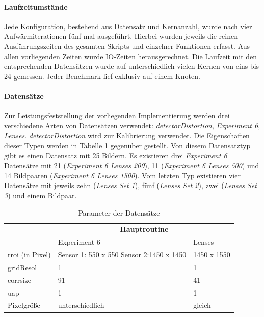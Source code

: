 \paragraph{Laufzeitumstände}

Jede Konfiguration, bestehend aus Datensatz und Kernanzahl, wurde nach vier Aufwärmiterationen fünf mal ausgeführt. Hierbei wurden jeweils die reinen Ausführungszeiten des gesamten Skripts und einzelner Funktionen erfasst. Aus allen vorliegenden Zeiten wurde \gls{IO}-Zeiten herausgerechnet. Die Laufzeit mit den entsprechenden Datensätzen wurde auf unterschiedlich vielen Kernen von eins bis 24 gemessen. Jeder Benchmark lief exklusiv auf einem Knoten. 

\paragraph{Datensätze}

Zur Leistungsfeststellung der vorliegenden Implementierung werden drei verschiedene Arten von Datensätzen verwendet: \textit{detectorDistortion}, \textit{Experiment 6}, \textit{Lenses}. \textit{detectorDistortion} wird zur Kalibrierung verwendet. Die Eigenschaften dieser Typen werden in Tabelle \ref{tab:datasets} gegenüber gestellt.  Von diesem Datensatztyp gibt es einen Datensatz mit 25 Bildern. Es existieren drei \textit{Experiment 6} Datensätze mit 21 (\textit{Experiment 6 Lenses 200}), 11 (\textit{Experiment 6 Lenses 500}) und 14 Bildpaaren (\textit{Experiment 6 Lenses 1500}). Vom letzten Typ existieren vier Datensätze mit jeweils zehn (\textit{Lenses Set 1}), fünf (\textit{Lenses Set 2}), zwei (\textit{Lenses Set 3}) und einem Bildpaar.

\begin{table}
	\begin{tabularx}{\textwidth}{| X || X | X |}
		\hline
		& \multicolumn{2}{c|}{\textbf{Hauptroutine}} \\
		\cline{1-3}
		& Experiment 6 & Lenses \\
		\hline
		\hline
		\gls{rroi} (in Pixel) & Sensor 1: 550 x 550 \newline
		Sensor 2:1450 x 1450  & 1450 x 1550 \\
		\hline
		\gls{gridResol} & 1 & 1 \\
		\hline
		\gls{corrsize} & 91 & 41 \\
		\hline
		\gls{uap} & 1 & 1 \\
		\hline
		Pixelgröße & unterschiedlich & gleich \\
		\hline
	\end{tabularx}
	\caption{Parameter der Datensätze}
	\label{tab:datasets}
\end{table}

